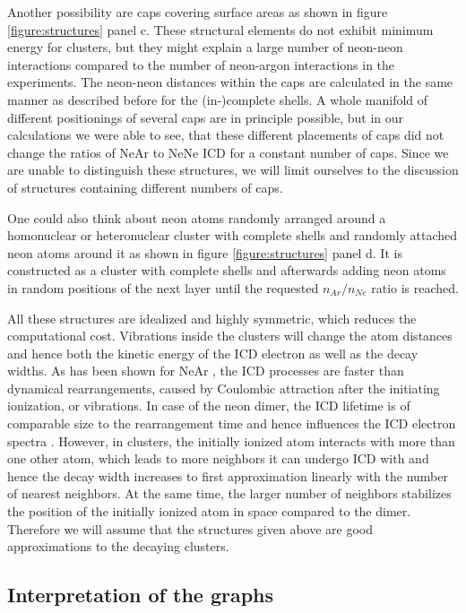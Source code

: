 Another possibility are caps covering surface areas as shown
in figure \ref{figure:structures} panel c. These structural elements
do not exhibit minimum energy for clusters, but they might explain a
large number of neon-neon interactions compared to the number of
neon-argon interactions in the experiments.
The neon-neon distances within the caps are
calculated in the same
manner as described before for the (in-)complete shells.
A whole manifold of different positionings of several caps are in principle
possible, but in our calculations we were able to see, that these different
placements of caps did not change the ratios of NeAr to NeNe ICD for a
constant number of caps. Since we
are unable to distinguish these structures, we will limit ourselves to the
discussion of structures containing different numbers of caps.

One could also think about neon atoms randomly arranged around a homonuclear
or heteronuclear cluster with complete shells and randomly attached neon
atoms around it as shown in figure \ref{figure:structures} panel d.
It is constructed as a cluster with complete shells and afterwards adding
neon atoms in random positions of the next layer until the requested
$n_{Ar}/n_{Ne}$ ratio is reached.

All these structures are idealized and highly symmetric, which reduces
the computational cost. Vibrations inside the clusters will change the atom
distances and hence both the kinetic energy of the ICD electron as well as
the decay widths. As has been shown for NeAr \cite{Scheit06}, the ICD processes
are faster than dynamical rearrangements, caused by Coulombic attraction
after the initiating ionization, or vibrations. In case of the neon dimer, the
ICD lifetime is of comparable size to the rearrangement time and hence
influences the ICD electron spectra \cite{Scheit03}. However, in clusters, the
initially ionized atom interacts with more than one other atom, which leads
to more neighbors it can undergo ICD with and hence the decay width increases
to first approximation linearly with the number of nearest neighbors.
At the same time, the larger number of neighbors stabilizes the position
of the initially ionized atom in space compared to the dimer.
Therefore we will assume that the structures given above are good
approximations to the decaying clusters.




\subsection{Interpretation of the graphs}

